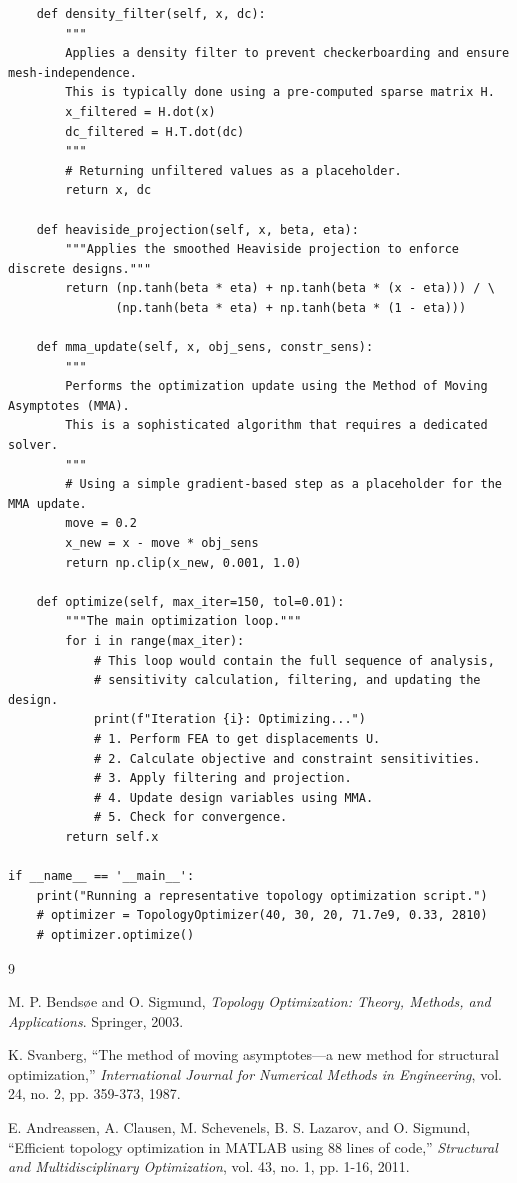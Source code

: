 \documentclass[11pt]{report}
\begin{document}
\begin{lstlisting}
    def density_filter(self, x, dc):
        """
        Applies a density filter to prevent checkerboarding and ensure mesh-independence.
        This is typically done using a pre-computed sparse matrix H.
        x_filtered = H.dot(x)
        dc_filtered = H.T.dot(dc)
        """
        # Returning unfiltered values as a placeholder.
        return x, dc

    def heaviside_projection(self, x, beta, eta):
        """Applies the smoothed Heaviside projection to enforce discrete designs."""
        return (np.tanh(beta * eta) + np.tanh(beta * (x - eta))) / \
               (np.tanh(beta * eta) + np.tanh(beta * (1 - eta)))

    def mma_update(self, x, obj_sens, constr_sens):
        """
        Performs the optimization update using the Method of Moving Asymptotes (MMA).
        This is a sophisticated algorithm that requires a dedicated solver.
        """
        # Using a simple gradient-based step as a placeholder for the MMA update.
        move = 0.2
        x_new = x - move * obj_sens
        return np.clip(x_new, 0.001, 1.0)

    def optimize(self, max_iter=150, tol=0.01):
        """The main optimization loop."""
        for i in range(max_iter):
            # This loop would contain the full sequence of analysis,
            # sensitivity calculation, filtering, and updating the design.
            print(f"Iteration {i}: Optimizing...")
            # 1. Perform FEA to get displacements U.
            # 2. Calculate objective and constraint sensitivities.
            # 3. Apply filtering and projection.
            # 4. Update design variables using MMA.
            # 5. Check for convergence.
        return self.x

if __name__ == '__main__':
    print("Running a representative topology optimization script.")
    # optimizer = TopologyOptimizer(40, 30, 20, 71.7e9, 0.33, 2810)
    # optimizer.optimize()
\end{lstlisting}

\begin{thebibliography}{9}

M. P. Bendsøe and O. Sigmund,
\textit{Topology Optimization: Theory, Methods, and Applications}.
Springer, 2003.

K. Svanberg,
``The method of moving asymptotes—a new method for structural optimization,''
\textit{International Journal for Numerical Methods in Engineering}, vol. 24, no. 2, pp. 359-373, 1987.

E. Andreassen, A. Clausen, M. Schevenels, B. S. Lazarov, and O. Sigmund,
``Efficient topology optimization in MATLAB using 88 lines of code,''
\textit{Structural and Multidisciplinary Optimization}, vol. 43, no. 1, pp. 1-16, 2011.

\end{thebibliography}
\end{document}
